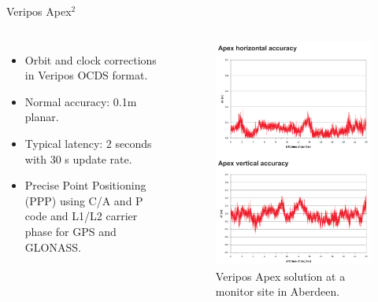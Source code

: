 \documentclass[11pt]{beamer}
\begin{document}
\begin{frame}{Veripos Apex$^2$}
	\begin{columns}[T,onlytextwidth]
		\begin{itemize}	
		\item Orbit and clock corrections in Veripos OCDS format.
		\item Normal accuracy: 0.1m planar. 
		\item Typical latency: 2 seconds with 30 s update rate.%
		\item Precise Point Positioning (PPP) using C/A and P code and L1/L2 carrier phase for GPS and GLONASS.
		\end{itemize}	
		\begin{figure}[T]
			\vspace*{-1cm}
			\includegraphics[height=0.8\textheight]{pic/Apex.png}
			\caption{Veripos Apex solution at a monitor site in Aberdeen.}
		\end{figure}
	\end{columns}
\end{frame}
\end{document}
